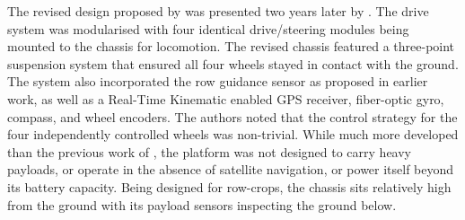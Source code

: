\documentclass[preprint,authoryear,12pt]{elsarticle}
\begin{document}

        The revised design proposed by \cite{Pedersen2002} was presented two years later by \cite{Bak2004}.
        The drive system was modularised with four identical drive/steering modules being mounted to the chassis for locomotion.
        The revised chassis featured a three-point suspension system that ensured all four wheels stayed in contact with the ground.
        The system also incorporated the row guidance sensor as proposed in earlier work, as well as a Real-Time Kinematic enabled GPS receiver, fiber-optic gyro, compass, and wheel encoders.
        The authors noted that the control strategy for the four independently controlled wheels was non-trivial.
        While much more developed than the previous work of \citep{Tillett1998}, the platform was not designed to carry heavy payloads, or operate in the absence of satellite navigation, or power itself beyond its battery capacity.
        Being designed for row-crops, the chassis sits relatively high from the ground with its payload sensors inspecting the ground below.
\end{document}
